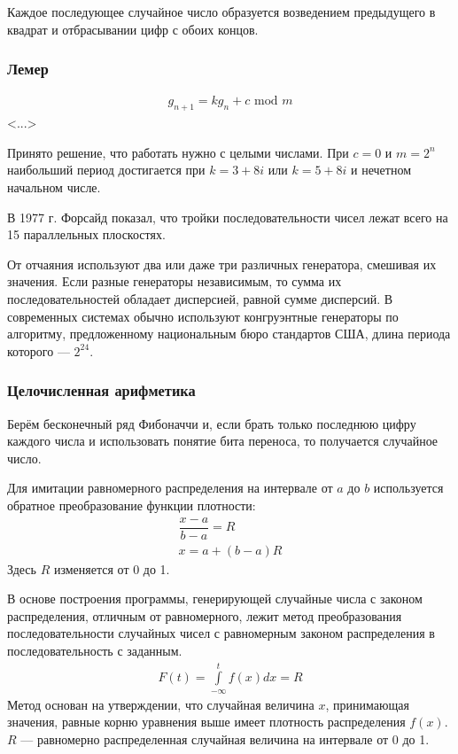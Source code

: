 Каждое последующее случайное число образуется возведением предыдущего в квадрат и отбрасывании цифр с обоих концов.

\subsubsection{Лемер}
%
\begin{gather*}
    g_{n+1} = kg_n + c\text{ mod }m
\end{gather*}
%
<...>

Принято решение, что работать нужно с целыми числами. При ${c = 0}$ и ${m = 2^n}$ наибольший период достигается при ${k = 3+8i}$ или ${k=5+8i}$ и нечетном начальном числе.

В 1977 г. Форсайд показал, что тройки последовательности чисел лежат всего на 15
параллельных плоскостях.

От отчаяния используют два или даже три различных генератора, смешивая их значения. Если разные генераторы независимым, то сумма их последовательностей обладает дисперсией, равной сумме дисперсий. В современных системах обычно используют конгруэнтные генераторы по алгоритму, предложенному национальным бюро стандартов США, длина периода которого --- $2^{24}$.

\subsubsection{Целочисленная арифметика}

Берём бесконечный ряд Фибоначчи и, если брать только последнюю цифру каждого числа и использовать понятие бита переноса, то получается случайное число.

Для имитации равномерного распределения на интервале от $a$ до $b$ используется обратное преобразование функции плотности:
%
\begin{gather*}
    \dfrac{x-a}{b-a} = R\\
    x = a + (b-a)R
\end{gather*}
%
Здесь $R$ изменяется от 0 до 1.

В основе построения программы, генерирующей случайные числа с законом распределения, отличным от равномерного, лежит метод преобразования последовательности случайных чисел с равномерным законом распределения в последовательность с заданным.
%
\begin{gather*}
    F(t) = \int\limits_{-\infty}^{t} f(x)dx = R
\end{gather*}
%
Метод основан на утверждении, что случайная величина $x$, принимающая значения, равные корню уравнения выше имеет плотность распределения $f(x)$. $R$ --- равномерно распределенная случайная величина на интервале от 0 до 1.

